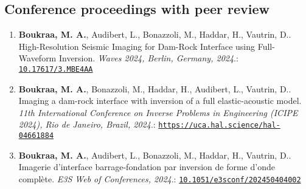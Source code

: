 \documentclass[10pt]{article} %
\begin{document}
\subsection{Conference proceedings with peer review}
\begin{enumerate}
\item \textbf{Boukraa, M. A.}, Audibert, L., Bonazzoli, M., Haddar, H., Vautrin, D.. High-Resolution Seismic Imaging for Dam-Rock Interface using Full-Waveform Inversion. \textit{Waves 2024, Berlin, Germany, 2024}.: \href{https://doi.org/10.17617/3.MBE4AA}{\nolinkurl{10.17617/3.MBE4AA}}
\item \textbf{Boukraa, M. A.}, Bonazzoli, M., Haddar, H., Audibert, L., Vautrin, D.. Imaging a dam-rock interface with inversion of a full elastic-acoustic model. \textit{11th International Conference on Inverse Problems in Engineering (ICIPE 2024), Rio de Janeiro, Brazil, 2024}.: \href{https://uca.hal.science/hal-04661884}{\nolinkurl{https://uca.hal.science/hal-04661884}}
\item \textbf{Boukraa, M. A.}, Audibert, L., Bonazzoli, M., Haddar, H., Vautrin, D.. Imagerie d’interface barrage-fondation par inversion de forme d’onde complète. \textit{E3S Web of Conferences, 2024}.: \href{https://doi.org/10.1051/e3sconf/202450404002}{\nolinkurl{10.1051/e3sconf/202450404002}}
\end{enumerate}




\end{document}
